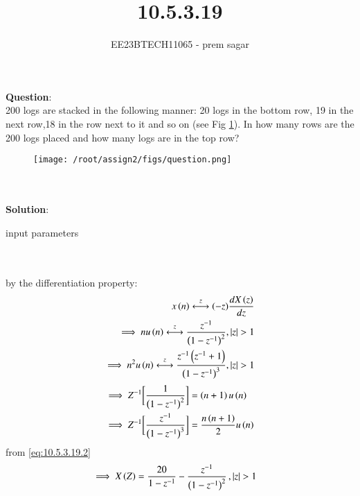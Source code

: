 \documentclass[journal,12pt,twocolumn]{IEEEtran}
\theoremstyle{remark}
\begin{document}

\vspace{3cm}

\title{10.5.3.19}
\author{EE23BTECH11065 - prem sagar}
\maketitle
\newpage

\bigskip 

\renewcommand{\thefigure}{\arabic{figure}}
\renewcommand{\thetable}{\arabic{table}}
\textbf{Question}:\\  200 logs are stacked in the following manner: 20 logs in the bottom row, 19 in the next row,18 in the row next to it and so on (see Fig \ref{fig:10.5.3.19.q}). In how many rows are the 200 logs placed and how many logs are in the top row?
\begin{figure}[h]
    \centering
    \texttt{[image: /root/assign2/figs/question.png]}
    \caption{ }
    \label{fig:10.5.3.19.q}
\end{figure}
\\\\\textbf{Solution}:
\begin{table}[!ht]
  \def\arraystretch{1.5}
  \centering
  \renewcommand\thetable{1}
  
  \caption{input parameters}
  \label{tab:10.5.3.19}
  \end{table}
\\\\by the differentiation property:
\\\begin{align}
 x\left(n\right)\overset{z}{\longleftrightarrow} (-z)\frac{dX\left(z\right)}{dz}
 \\\implies n u\left(n\right)\overset{z}{\longleftrightarrow} \frac{z^{-1}}{\left(1-z^{-1}\right)^2},\left\vert z\right\vert>1
 \label{eq:10.5.3.19.2}
 \\\implies n^2 u\left(n\right)\overset{z}{\longleftrightarrow} \frac{z^{-1}\left(z^{-1}+1\right)}{\left(1-z^{-1}\right)^3} ,\left\vert z\right\vert>1
 \end{align}
 \begin{align}
 \implies Z^{-1}\biggl[\frac{1}{\left(1-z^{-1}\right)^2}\biggr]&=\left(n+1\right)u\left(n\right)
 \label{eq:10.5.3.19.4}
\\\implies Z^{-1}\biggl[\frac{z^{-1}}{\left(1-z^{-1}\right)^3}\biggr]&=\frac{n\left(n+1\right)}{2}u\left(n\right)
\label{eq:10.5.3.19.5}
 \end{align}
 from \eqref{eq:10.5.3.19.2}
\begin{align} 
\implies X\left(Z\right)&=\frac{20}{1-z^{-1}}-\frac{z^{-1}}{\left(1-z^{-1}\right)^2}\,,\left\vert z\right\vert>1
\label{eq:10.5.3.19.9}
\end{align}
\end{document}
